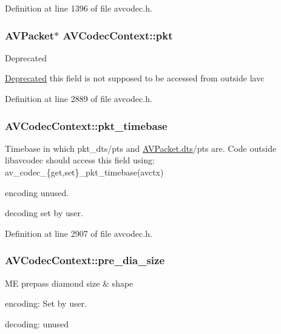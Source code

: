 Definition at line 1396 of file avcodec.\+h.

\subsubsection[{\texorpdfstring{pkt}{pkt}}]{ {\bf A\+V\+Packet}$\ast$ A\+V\+Codec\+Context\+::pkt}\hypertarget{struct_a_v_codec_context_a664ccfc97e45f52d4086759431f0c1fa}{}\label{struct_a_v_codec_context_a664ccfc97e45f52d4086759431f0c1fa}
\begin{DoxyRefDesc}{Deprecated}
\item[\hyperlink{deprecated__deprecated000023}{Deprecated}]this field is not supposed to be accessed from outside lavc \end{DoxyRefDesc}


Definition at line 2889 of file avcodec.\+h.

\subsubsection[{\texorpdfstring{pkt\+\_\+timebase}{pkt_timebase}}]{ A\+V\+Codec\+Context\+::pkt\+\_\+timebase}\hypertarget{struct_a_v_codec_context_a33a289c990bc3fbcad01c4a09f34da38}{}\label{struct_a_v_codec_context_a33a289c990bc3fbcad01c4a09f34da38}
Timebase in which pkt\+\_\+dts/pts and \hyperlink{struct_a_v_packet_a85dbbd306b44b02390cd91c45e6a0f76}{A\+V\+Packet.\+dts}/pts are. Code outside libavcodec should access this field using\+: av\+\_\+codec\+\_\+\{get,set\}\+\_\+pkt\+\_\+timebase(avctx)
\begin{DoxyItemize}
\item encoding unused.
\item decoding set by user. 
\end{DoxyItemize}

Definition at line 2907 of file avcodec.\+h.

\subsubsection[{\texorpdfstring{pre\+\_\+dia\+\_\+size}{pre_dia_size}}]{ A\+V\+Codec\+Context\+::pre\+\_\+dia\+\_\+size}\hypertarget{struct_a_v_codec_context_ae0eacb07c8a7a5b231d64c70c88645ff}{}\label{struct_a_v_codec_context_ae0eacb07c8a7a5b231d64c70c88645ff}
ME prepass diamond size \& shape
\begin{DoxyItemize}
\item encoding\+: Set by user.
\item decoding\+: unused 
\end{DoxyItemize}

